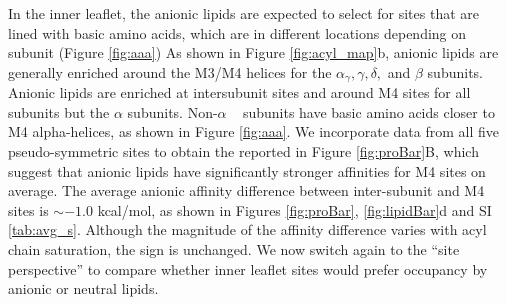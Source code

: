 In the inner leaflet, the anionic lipids are expected to select for sites that are lined with basic amino acids, which are in different locations depending on subunit (Figure \ref{fig:aaa})  As shown in Figure \ref{fig:acyl_map}b, anionic lipids are generally enriched around the M3/M4 helices for the $\alpha_{\gamma}, \gamma,\delta,$ and $\beta$ subunits.  Anionic lipids are enriched at intersubunit sites and around M4 sites for all subunits but the $\alpha$ subunits. Non-$\alpha$ \nachr~ subunits have basic amino acids closer to M4 alpha-helices, as shown in Figure \ref{fig:aaa}.  We incorporate data from all five pseudo-symmetric sites to obtain the \newaffinities{} reported in Figure \ref{fig:proBar}B, which suggest that anionic lipids have significantly stronger affinities for M4 sites on average. The average anionic affinity difference between inter-subunit and M4 sites is $\sim -1.0$ kcal/mol, as shown in Figures \ref{fig:proBar}, \ref{fig:lipidBar}d and SI \ref{tab:avg_s}. Although the magnitude of the affinity difference varies with acyl chain saturation, the sign is unchanged.     %
We now switch again to the ``site perspective'' to compare whether inner leaflet sites would prefer occupancy by anionic or neutral lipids. %
